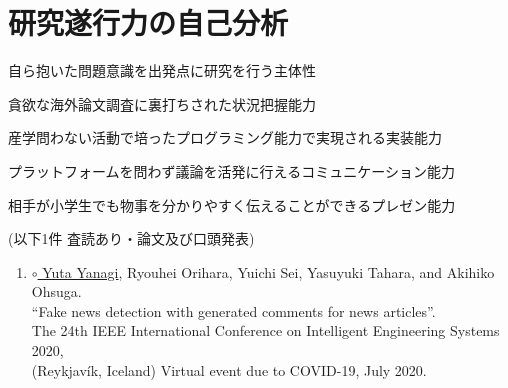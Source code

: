 
\section{研究遂行力の自己分析}

\noindent
{}

自ら抱いた問題意識を出発点に研究を行う主体性

貪欲な海外論文調査に裏打ちされた状況把握能力

産学問わない活動で培ったプログラミング能力で実現される実装能力

プラットフォームを問わず議論を活発に行えるコミュニケーション能力

相手が小学生でも物事を分かりやすく伝えることができるプレゼン能力

(以下1件 査読あり・論文及び口頭発表)
\begin{enumerate}
    \item \underline{$\circ$ Yuta Yanagi}, Ryouhei Orihara, Yuichi Sei, Yasuyuki Tahara, and Akihiko Ohsuga.\\
    ``Fake news detection with generated comments for news articles''.\\
    The 24th IEEE International Conference on Intelligent Engineering Systems 2020,\\
    (Reykjavík, Iceland) Virtual event due to COVID-19, July 2020.
\end{enumerate}

